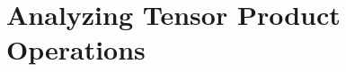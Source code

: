 \documentclass{article}
\theoremstyle{definition}
\theoremstyle{remark}
\begin{document}

\section{Analyzing Tensor Product Operations}
\label{sec:tp}

\end{document}
